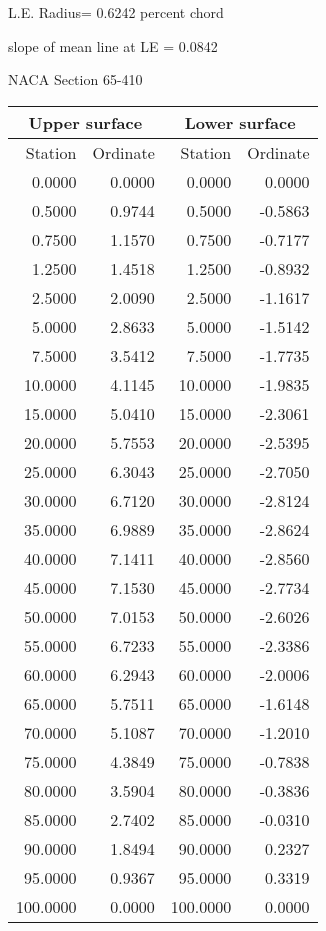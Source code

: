 \documentclass[11pt]{book}
\begin{document}
L.E. Radius=  0.6242 percent chord


 slope of mean line at LE =  0.0842
 \newpage
  \label{s65-410}
 \begin{Large}
 NACA Section 65-410
 \end{Large}
  
 \vspace{8mm}
 \begin{tabular}{|r|r|r|r|} \hline 
 \multicolumn{2}{|c|}{Upper surface} & \multicolumn{2}{|c|}{Lower surface} \\
 \hline
 Station & Ordinate & Station & Ordinate \\
 \hline
0.0000 & 0.0000 & 0.0000 & 0.0000 \\
0.5000 & 0.9744 & 0.5000 & -0.5863 \\
0.7500 & 1.1570 & 0.7500 & -0.7177 \\
1.2500 & 1.4518 & 1.2500 & -0.8932 \\
2.5000 & 2.0090 & 2.5000 & -1.1617 \\
5.0000 & 2.8633 & 5.0000 & -1.5142 \\
7.5000 & 3.5412 & 7.5000 & -1.7735 \\
10.0000 & 4.1145 & 10.0000 & -1.9835 \\
15.0000 & 5.0410 & 15.0000 & -2.3061 \\
20.0000 & 5.7553 & 20.0000 & -2.5395 \\
25.0000 & 6.3043 & 25.0000 & -2.7050 \\
30.0000 & 6.7120 & 30.0000 & -2.8124 \\
35.0000 & 6.9889 & 35.0000 & -2.8624 \\
40.0000 & 7.1411 & 40.0000 & -2.8560 \\
45.0000 & 7.1530 & 45.0000 & -2.7734 \\
50.0000 & 7.0153 & 50.0000 & -2.6026 \\
55.0000 & 6.7233 & 55.0000 & -2.3386 \\
60.0000 & 6.2943 & 60.0000 & -2.0006 \\
65.0000 & 5.7511 & 65.0000 & -1.6148 \\
70.0000 & 5.1087 & 70.0000 & -1.2010 \\
75.0000 & 4.3849 & 75.0000 & -0.7838 \\
80.0000 & 3.5904 & 80.0000 & -0.3836 \\
85.0000 & 2.7402 & 85.0000 & -0.0310 \\
90.0000 & 1.8494 & 90.0000 & 0.2327 \\
95.0000 & 0.9367 & 95.0000 & 0.3319 \\
100.0000 & 0.0000 & 100.0000 & 0.0000 \\
 \hline 
 \end{tabular}
\end{document}
